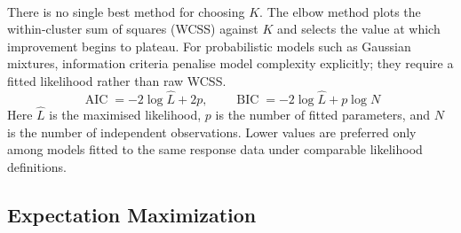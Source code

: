 \begin{tcbitemize}[ skin=sectionraster ]
    \tcbitem[title={Choosing K: Elbow Method and Information Criteria}, raster multicolumn=3]
    There is no single best method for choosing $K$\textsuperscript{\cite[][p.169]{iiiCourseMachineLearning}}. The elbow method plots the within-cluster sum of squares (WCSS) against $K$ and selects the value at which improvement begins to plateau. For probabilistic models such as Gaussian mixtures, information criteria penalise model complexity explicitly; they require a fitted likelihood rather than raw WCSS.
    \tcblower
    \begin{equation}
        \operatorname{AIC} = -2\log \hat L + 2p,
        \qquad
        \operatorname{BIC} = -2\log \hat L + p\log N
    \end{equation}
    Here $\hat L$ is the maximised likelihood, $p$ is the number of fitted parameters, and $N$ is the number of independent observations. Lower values are preferred only among models fitted to the same response data under comparable likelihood definitions.
\end{tcbitemize}

\subsection{Expectation Maximization}

